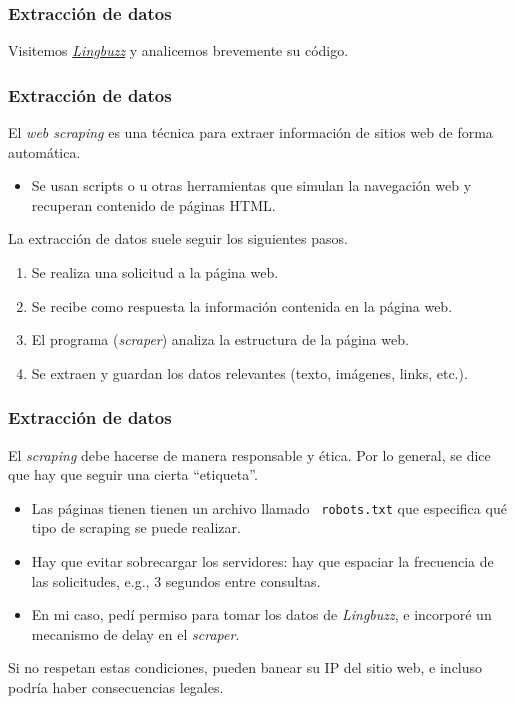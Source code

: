 \documentclass{beamer}
\newcommand{\blue}[1] {{\color{blue} #1}}
\begin{document}
\begin{frame}
\frametitle{Extracción de datos}

Visitemos \href{https://ling.auf.net/lingbuzz/lingbuzz}{\alert{\textit{Lingbuzz}}} y analicemos brevemente su código.

\end{frame}



\begin{frame}
\frametitle{Extracción de datos}

El \alert{\textit{web scraping}} es una técnica para extraer información de sitios web de forma automática.

\begin{itemize}
\item[\ding{52}] Se usan scripts o u otras herramientas que simulan la navegación web y recuperan contenido de páginas HTML.
\end{itemize}


La extracción de datos suele seguir los siguientes pasos.

\begin{enumerate}
\item Se realiza una solicitud a la página web.

\item Se recibe como respuesta la información contenida en la página web.

\item El programa (\textit{\alert{scraper}}) analiza la estructura de la página web.

\item Se extraen y guardan los datos relevantes (texto, imágenes, links, etc.).
\end{enumerate}

\end{frame}

\begin{frame}
\frametitle{Extracción de datos}

El \alert{\textit{scraping}} debe hacerse de manera responsable y ética. Por lo general, se dice que hay que seguir una cierta ``etiqueta''.

\begin{itemize}
\item[\ding{52}] Las páginas tienen tienen un archivo llamado \texttt{\blue{robots.txt}} que especifica qué tipo de scraping se puede realizar.

\item[\ding{52}] Hay que evitar sobrecargar los servidores: hay que espaciar la frecuencia de las solicitudes, e.g., 3 segundos entre consultas.

\item[\ding{52}] En mi caso, pedí permiso para tomar los datos de \alert{\textit{Lingbuzz}}, e incorporé un mecanismo de delay en el \alert{\textit{scraper}}.
\end{itemize}

Si no respetan estas condiciones, pueden banear su IP del sitio web, e incluso podría haber consecuencias legales.

\end{frame}
\end{document}
